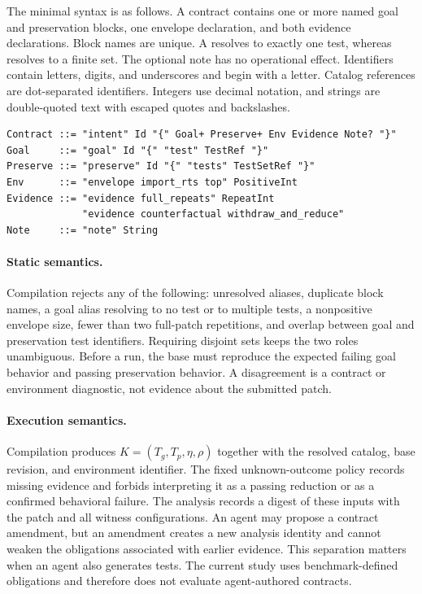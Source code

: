 \documentclass[a4paper,fleqn]{cas-sc}
\newcommand{\code}[1]{\texttt{\detokenize{#1}}}
\begin{document}
The minimal syntax is as follows. A contract contains one or more named goal and preservation blocks, one envelope declaration, and both evidence declarations. Block names are unique. A \code{test} resolves to exactly one test, whereas \code{tests} resolves to a finite set. The optional note has no operational effect. Identifiers contain letters, digits, and underscores and begin with a letter. Catalog references are dot-separated identifiers. Integers use decimal notation, and strings are double-quoted text with escaped quotes and backslashes.
\begin{lstlisting}[numbers=none,basicstyle=\ttfamily\small,caption={Core grammar. Braces and quoted words are terminals.},label=lst:grammar]
Contract ::= "intent" Id "{" Goal+ Preserve+ Env Evidence Note? "}"
Goal     ::= "goal" Id "{" "test" TestRef "}"
Preserve ::= "preserve" Id "{" "tests" TestSetRef "}"
Env      ::= "envelope import_rts top" PositiveInt
Evidence ::= "evidence full_repeats" RepeatInt
             "evidence counterfactual withdraw_and_reduce"
Note     ::= "note" String
\end{lstlisting}

\paragraph{Static semantics.}
Compilation rejects any of the following: unresolved aliases, duplicate block names, a goal alias resolving to no test or to multiple tests, a nonpositive envelope size, fewer than two full-patch repetitions, and overlap between goal and preservation test identifiers. Requiring disjoint sets keeps the two roles unambiguous. Before a run, the base must reproduce the expected failing goal behavior and passing preservation behavior. A disagreement is a contract or environment diagnostic, not evidence about the submitted patch.

\paragraph{Execution semantics.}
Compilation produces $K=(T_g,T_p,\eta,\rho)$ together with the resolved catalog, base revision, and environment identifier. The fixed unknown-outcome policy records missing evidence and forbids interpreting it as a passing reduction or as a confirmed behavioral failure. The analysis records a digest of these inputs with the patch and all witness configurations. An agent may propose a contract amendment, but an amendment creates a new analysis identity and cannot weaken the obligations associated with earlier evidence. This separation matters when an agent also generates tests. The current study uses benchmark-defined obligations and therefore does not evaluate agent-authored contracts.
\end{document}
